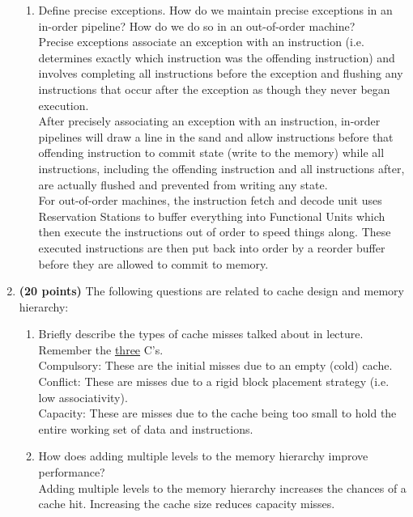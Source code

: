 \documentclass[11pt]{article}
\begin{document}
\begin{enumerate}
\begin{enumerate}
        \item Define precise exceptions. How do we maintain precise exceptions in an in-order pipeline? How do we do so in an out-of-order machine?\\[1em]
        Precise exceptions associate an exception with an instruction (i.e. determines exactly which instruction was the offending instruction) and involves completing all instructions before the exception and flushing any instructions that occur after the exception as though they never began execution.\\

        After precisely associating an exception with an instruction, in-order pipelines will draw a line in the sand and allow instructions before that offending instruction to commit state (write to the memory) while all instructions, including the offending instruction and all instructions after, are actually flushed and prevented from writing any state.\\

        For out-of-order machines, the instruction fetch and decode unit uses Reservation Stations to buffer everything into Functional Units which then execute the instructions out of order to speed things along. These executed instructions are then put back into order by a reorder buffer before they are allowed to commit to memory.\\
    \end{enumerate}
\newpage
    \item \textbf{(20 points)} The following questions are related to cache design and memory hierarchy:
    \begin{enumerate}
        \item Briefly describe the types of cache misses talked about in lecture. Remember the \underline{three} C’s.\\[1em]
        Compulsory: These are the initial misses due to an empty (cold) cache.\\
        Conflict: These are misses due to a rigid block placement strategy (i.e. low associativity).\\ Capacity: These are misses due to the cache being too small to hold the entire working set of data and instructions.\\

        \item How does adding multiple levels to the memory hierarchy improve performance?\\[1em]
        Adding multiple levels to the memory hierarchy increases the chances of a cache hit. Increasing the cache size reduces capacity misses.\\


\end{enumerate}
\end{enumerate}
\end{document}

